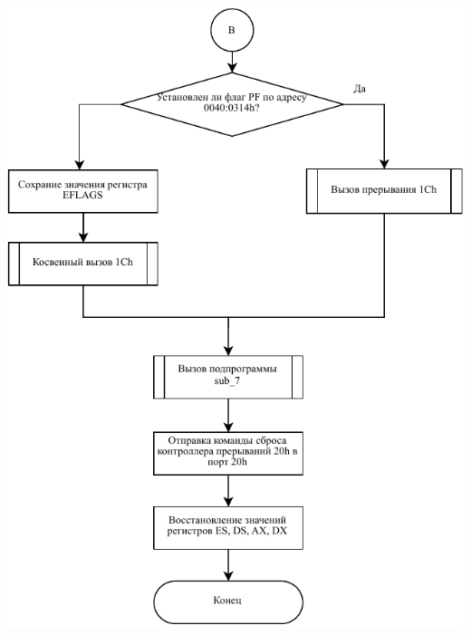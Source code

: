 \documentclass[a4paper,12pt]{article}
\begin{document}
\begin{center}
    \includegraphics[height=0.95\textheight]{flowchart/4.pdf}
\end{center}

\end{document}
